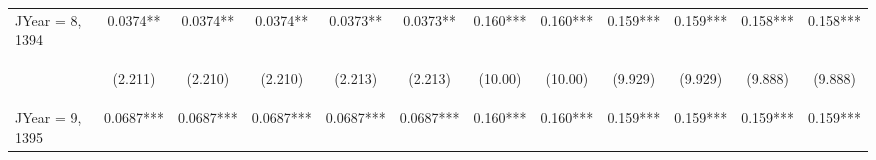 \documentclass[]{article}
\begin{document}
\begin{center}
\begin{tabular}{lccccccccccc}
JYear = 8, 1394 & 0.0374** & 0.0374** & 0.0374** & 0.0373** & 0.0373** & 0.160*** & 0.160*** & 0.159*** & 0.159*** & 0.158*** & 0.158*** \\
\vspace{4pt} & \begin{footnotesize}(2.211)\end{footnotesize} & \begin{footnotesize}(2.210)\end{footnotesize} & \begin{footnotesize}(2.210)\end{footnotesize} & \begin{footnotesize}(2.213)\end{footnotesize} & \begin{footnotesize}(2.213)\end{footnotesize} & \begin{footnotesize}(10.00)\end{footnotesize} & \begin{footnotesize}(10.00)\end{footnotesize} & \begin{footnotesize}(9.929)\end{footnotesize} & \begin{footnotesize}(9.929)\end{footnotesize} & \begin{footnotesize}(9.888)\end{footnotesize} & \begin{footnotesize}(9.888)\end{footnotesize} \\
JYear = 9, 1395 & 0.0687*** & 0.0687*** & 0.0687*** & 0.0687*** & 0.0687*** & 0.160*** & 0.160*** & 0.159*** & 0.159*** & 0.159*** & 0.159*** \\

\end{tabular}
\end{center}
\end{document}
